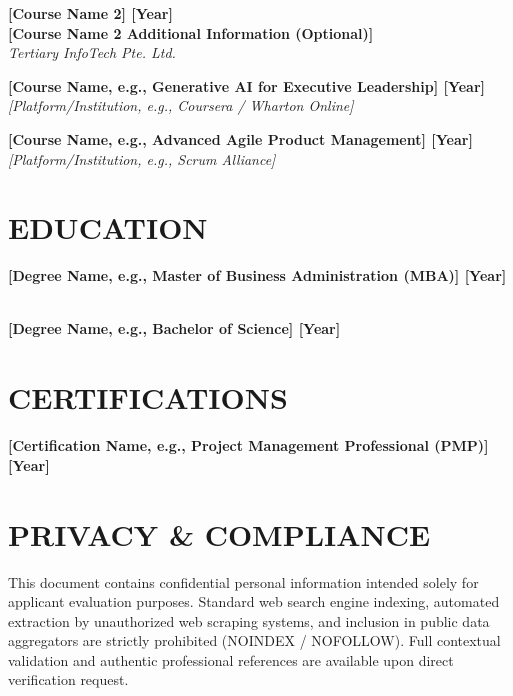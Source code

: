 \documentclass[10pt,a4paper]{article}
\newcommand{\resumeline}{\vspace{-8pt}\noindent\makebox[\linewidth]{\rule{\linewidth}{0.5pt}}\vspace{4pt}}
\begin{document}
	\noindent \textbf{[Course Name 2] \hfill [Year]} \\
	\textbf{[Course Name 2 Additional Information (Optional)]} \\
	\noindent \textit{Tertiary InfoTech Pte. Ltd.}
	
	\vspace{6pt}
	
	\noindent \textbf{[Course Name, e.g., Generative AI for Executive Leadership] \hfill [Year]} \\
	\noindent \textit{[Platform/Institution, e.g., Coursera / Wharton Online]}
	
	\vspace{6pt}
	
	\noindent \textbf{[Course Name, e.g., Advanced Agile Product Management] \hfill [Year]} \\
	\noindent \textit{[Platform/Institution, e.g., Scrum Alliance]}
	
	\section*{EDUCATION}
	\resumeline
	
	\noindent \textbf{[Degree Name, e.g., Master of Business Administration (MBA)] \hfill [Year]} \\
	 \\
	\vspace{2pt}
	
	\noindent \textbf{[Degree Name, e.g., Bachelor of Science] \hfill [Year]} \\
	
	\section*{CERTIFICATIONS}
	\resumeline
	
	\noindent \textbf{[Certification Name, e.g., Project Management Professional (PMP)] \hfill [Year]} \\
	
	\section*{PRIVACY \& COMPLIANCE}
	\resumeline
	
	\noindent \small This document contains confidential personal information intended solely for applicant evaluation purposes. Standard web search engine indexing, automated extraction by unauthorized web scraping systems, and inclusion in public data aggregators are strictly prohibited (NOINDEX / NOFOLLOW). Full contextual validation and authentic professional references are available upon direct verification request.
	
\end{document}

